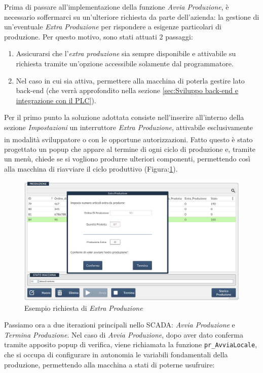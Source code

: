 Prima di passare all'implementazione della funzione \textit{Avvia Produzione}, è necessario soffermarci su un'ulteriore richiesta da parte dell'azienda: la gestione di un'eventuale \textit{Extra Produzione} per rispondere a esigenze particolari di produzione. Per questo motivo, sono stati attuati 2 passaggi:
\begin{enumerate}
    \item Assicurarsi che l'\textit{extra produzione} sia sempre disponibile e attivabile su richiesta tramite un'opzione accessibile solamente dal programmatore.
    \item Nel caso in cui sia attiva, permettere alla macchina di poterla gestire lato back-end (che verrà approfondito nella sezione \ref{sec:Sviluppo back-end e integrazione con il PLC}).
\end{enumerate}
Per il primo punto la soluzione adottata consiste nell'inserire all'interno della sezione \textit{Impostazioni} un interruttore \textit{Extra Produzione}, attivabile esclusivamente in modalità sviluppatore o con le opportune autorizzazioni\textsuperscript{\cite{factorytalk_users_groups}}. Fatto questo è stato progettato un popup che appare al termine di ogni ciclo di produzione e, tramite un menù, chiede se si vogliono produrre ulteriori componenti, permettendo così alla macchina di riavviare il ciclo produttivo (Figura:\ref{fig:Extraproduzione.png}).

\begin{figure} 
    \centering
    \includegraphics[width=1\linewidth]{Immagini/ExtraProduzione.png}
    \caption{Esempio richiesta di \textit{Extra Produzione}}
    \label{fig:Extraproduzione.png}
\end{figure}

Passiamo ora a due iterazioni principali nello SCADA: \textit{Avvia Produzione} e \textit{Termina Produzione}. Nel caso di \textit{Avvia Produzione}, dopo aver dato conferma tramite apposito popup di verifica, viene richiamata la funzione \verb|pr_AvviaLocale|, che si occupa di configurare in autonomia le variabili fondamentali della produzione, permettendo alla macchina a stati di poterne usufruire:

